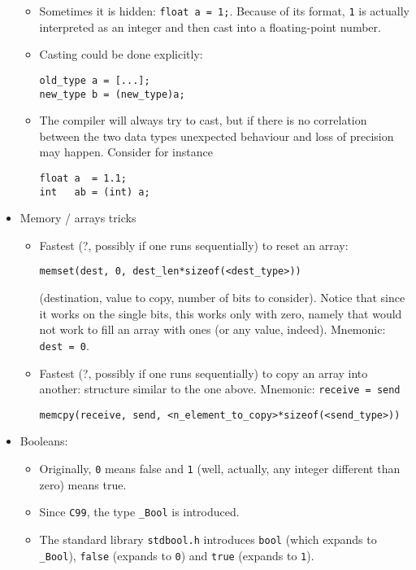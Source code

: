 \documentclass[a4paper,12pt,%
              final%
              ]{article}
\begin{document}
\begin{itemize}
\begin{itemize}
      \item Sometimes it is hidden: \verb|float a = 1;|. Because of its format, \verb|1| is actually interpreted as an integer and then cast into a floating-point number.
      \item Casting could be done explicitly:
\begin{verbatim}
old_type a = [...];
new_type b = (new_type)a;
\end{verbatim}
      \item The compiler will always try to cast, but if there is no correlation between the two data types unexpected behaviour and loss of precision may happen. Consider for instance
\begin{verbatim}
float a  = 1.1;
int   ab = (int) a;
\end{verbatim}
    \end{itemize}
  \item Memory / arrays tricks
    \begin{itemize}
      \item Fastest (?, possibly if one runs sequentially) to reset an array:
\begin{verbatim}
memset(dest, 0, dest_len*sizeof(<dest_type>))
\end{verbatim}
        (destination, value to copy, number of bits to consider). Notice that since it works on the single bits, this works only with zero, namely that would not work to fill an array with ones (or any value, indeed). Mnemonic: \verb|dest = 0|.
      \item Fastest (?, possibly if one runs sequentially) to copy an array into another: structure similar to the one above. Mnemonic: \verb|receive = send|
\begin{verbatim}
memcpy(receive, send, <n_element_to_copy>*sizeof(<send_type>))
\end{verbatim}
    \end{itemize}
  \item Booleans:
    \begin{itemize}
      \item Originally, \verb|0| means false and \verb|1| (well, actually, any integer different than zero) means true.
      \item Since \verb|C99|, the type \verb|_Bool| is introduced.
      \item The standard library \verb|stdbool.h| introduces \verb|bool| (which expands to \verb|_Bool|), \verb|false| (expands to \verb|0|) and \verb|true| (expands to \verb|1|).
    \end{itemize}

\end{itemize}
\end{document}

